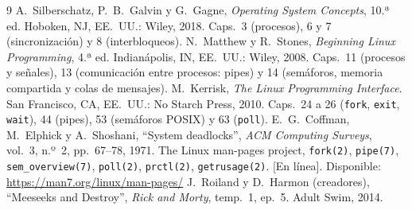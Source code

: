 \begin{thebibliography}{9}
 A.~Silberschatz, P.~B.~Galvin y G.~Gagne, \emph{Operating System
  Concepts}, 10.ª ed. Hoboken, NJ, EE.~UU.: Wiley, 2018. Caps.~3 (procesos), 6 y 7
  (sincronización) y 8 (interbloqueos).
 N.~Matthew y R.~Stones, \emph{Beginning Linux Programming}, 4.ª ed.
  Indianápolis, IN, EE.~UU.: Wiley, 2008. Caps.~11 (procesos y señales), 13 (comunicación
  entre procesos: pipes) y 14 (semáforos, memoria compartida y colas de mensajes).
 M.~Kerrisk, \emph{The Linux Programming Interface}. San Francisco, CA,
  EE.~UU.: No Starch Press, 2010. Caps.~24 a 26 (\texttt{fork}, \texttt{exit},
  \texttt{wait}), 44 (pipes), 53 (semáforos POSIX) y 63 (\texttt{poll}).
 E.~G.~Coffman, M.~Elphick y A.~Shoshani, ``System deadlocks'',
  \emph{ACM Computing Surveys}, vol.~3, n.º~2, pp.~67--78, 1971.
 The Linux man-pages project, \texttt{fork(2)}, \texttt{pipe(7)},
  \texttt{sem\_overview(7)}, \texttt{poll(2)}, \texttt{prctl(2)}, \texttt{getrusage(2)}.
  [En línea]. Disponible: \url{https://man7.org/linux/man-pages/}
 J.~Roiland y D.~Harmon (creadores), ``Meeseeks and Destroy'', \emph{Rick and
  Morty}, temp.~1, ep.~5. Adult Swim, 2014.
\end{thebibliography}
